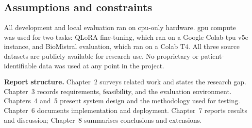 \subsection{Assumptions and constraints}

All development and local evaluation ran on \ac{cpu}-only hardware. \ac{gpu} compute was used for two tasks: QLoRA fine-tuning, which ran on a Google Colab \ac{tpu} v5e instance, and BioMistral evaluation, which ran on a Colab T4. All three source datasets are publicly available for research use. No proprietary or patient-identifiable data was used at any point in the project.

\medskip
\noindent\textbf{Report structure.} Chapter~2 surveys related work and states the research gap. Chapter~3 records requirements, feasibility, and the evaluation environment. Chapters~4 and~5 present system design and the methodology used for testing. Chapter~6 documents implementation and deployment. Chapter~7 reports results and discussion; Chapter~8 summarises conclusions and extensions.
